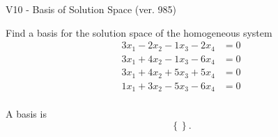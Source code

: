 \begin{exercise}
  \begin{exerciseTitle}V10 - Basis of Solution Space (ver. 985)\end{exerciseTitle}
  \begin{exerciseStatement}
    Find a basis for the solution space of the homogeneous system 
\begin{align*}
 3 x_ 1 -2 x_ 2 -1 x_ 3 -2 x_ 4 &= 0  \\ 
  3 x_ 1 + 4 x_ 2 -1 x_ 3 -6 x_ 4 &= 0  \\ 
  3 x_ 1 + 4 x_ 2 + 5 x_ 3 + 5 x_ 4 &= 0  \\ 
  1 x_ 1 + 3 x_ 2 -5 x_ 3 -6 x_ 4 &= 0  \\ 
 \end{align*}


 
  \end{exerciseStatement}

  \begin{exerciseAnswer}
   A basis is   
\[\left\{\right\}.\]

  


  \end{exerciseAnswer}
\end{exercise}